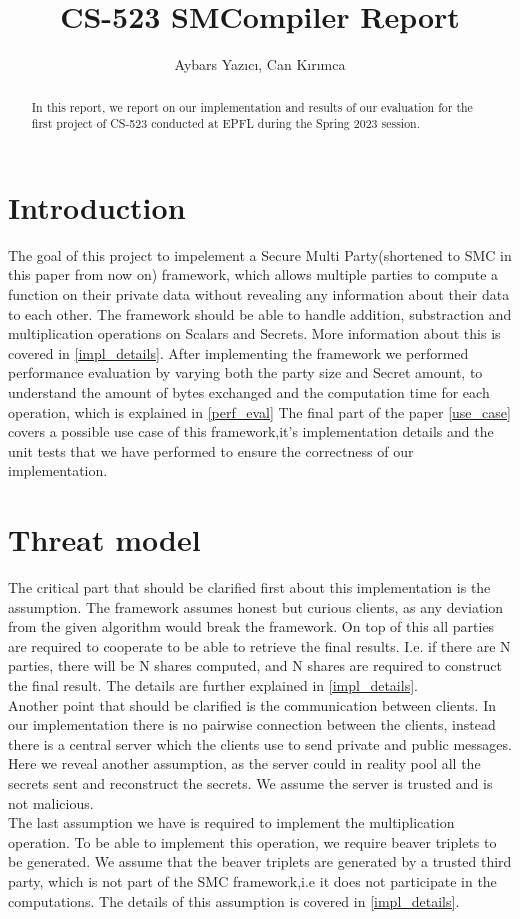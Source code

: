 \documentclass[10pt,conference,compsocconf]{IEEEtran}
\title{CS-523 SMCompiler Report}
\author{Aybars Yazıcı, Can Kırımca}
\date{}
\begin{document}
\maketitle

\begin{abstract}
    In this report, we report on our implementation and results 
    of our evaluation for the first project of CS-523 conducted at
    EPFL during the Spring 2023 session.
\end{abstract}

\section{Introduction}
The goal of this project to impelement a Secure Multi Party(shortened to SMC in this paper from now on) 
framework, which allows multiple parties to compute a function on their private data without revealing
any information about their data to each other. The framework should be able to handle addition, substraction 
and multiplication operations on Scalars and Secrets. More information about this is covered in \ref{impl_details}. 
After implementing the framework  we performed performance evaluation by varying both the party size and Secret amount, 
to understand the amount of bytes exchanged and the computation time for each operation, which is explained in \ref{perf_eval} 
The final part of  the paper \ref{use_case} covers a possible use case of this framework,it's implementation details 
and the unit tests that we have performed to ensure the correctness of our implementation.

\section{Threat model}
\label{threat_model}
The critical part that should be clarified first about this implementation is the assumption. The framework assumes 
honest but curious clients, as any deviation from the given algorithm would break the framework. On top of this all parties are 
required to cooperate to be able to retrieve the final results. I.e. if there are N parties, there will be N shares computed, 
and N shares are required to construct the final result. The details are further explained in \ref{impl_details}. 
\\
Another point that should be clarified is the communication between clients. In our implementation there is no pairwise connection
between the clients, instead there is a central server which the clients use to send private and public messages. Here we reveal another
assumption, as the server could in reality pool all the secrets sent and reconstruct the secrets. We assume the server is trusted and is
not malicious.
\\
The last assumption we have is required to implement the multiplication operation. To be able to implement this operation, we require 
beaver triplets to be generated. We assume that the beaver triplets are generated by a trusted third party, which is not part of the
SMC framework,i.e it does not participate in the computations. The details of this assumption is covered in \ref{impl_details}.
\end{document}
